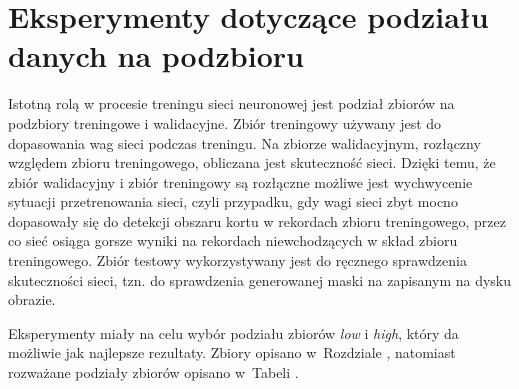 \section{Eksperymenty dotyczące podziału danych na podzbioru}
\label{sec:podzial_eksperyment}

Istotną rolą w procesie treningu sieci neuronowej jest podział zbiorów na podzbiory treningowe i walidacyjne.
Zbiór treningowy używany jest do dopasowania wag sieci podczas treningu.
Na zbiorze walidacyjnym, rozłączny względem zbioru treningowego, obliczana jest skuteczność sieci.
Dzięki temu, że zbiór walidacyjny i zbiór treningowy są rozłączne możliwe jest wychwycenie sytuacji przetrenowania sieci, czyli przypadku, gdy wagi sieci zbyt mocno dopasowały się do detekcji obszaru kortu w rekordach zbioru treningowego, przez co sieć osiąga gorsze wyniki na rekordach niewchodzących w skład zbioru treningowego.
Zbiór testowy wykorzystywany jest do ręcznego sprawdzenia skuteczności sieci, tzn. do sprawdzenia generowanej maski na zapisanym na dysku obrazie.

Eksperymenty miały na celu wybór podziału zbiorów \textit{low} i \textit{high}, który da możliwie jak najlepsze rezultaty. Zbiory opisano w~Rozdziale , natomiast rozważane podziały zbiorów opisano w~Tabeli .

